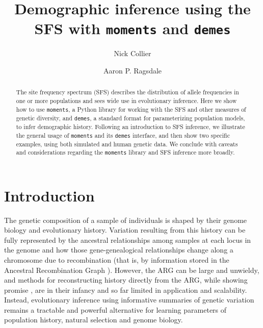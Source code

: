 \documentclass[]{article}
\newcommand{\moments}{\texttt{moments}\xspace}
\newcommand{\demes}{\texttt{demes}\xspace}
\begin{document}
\title{Demographic inference using the SFS with \moments and \demes}
\author[1]{Nick Collier}
\author[1,*]{Aaron P. Ragsdale}
\maketitle


\begin{abstract}

    The site frequency spectrum (SFS) describes the distribution of allele
    frequencies in one or more populations and sees wide use in evolutionary
    inference. Here we show how to use \moments, a Python library for working
    with the SFS and other measures of genetic diversity, and \demes, a
    standard format for parameterizing population models, to infer demographic
    history. Following an introduction to SFS inference, we illustrate the
    general usage of \moments and its \demes interface, and then show two
    specific examples, using both simulated and human genetic data. We conclude
    with caveats and considerations regarding the \moments library and SFS
    inference more broadly.

\end{abstract}

\section*{Introduction}

The genetic composition of a sample of individuals is shaped by their genome
biology and evolutionary history. Variation resulting from this history can be
fully represented by the ancestral relationships among samples at each locus in
the genome and how those gene-genealogical relationships change along a
chromosome due to recombination (that is, by information stored in the
Ancestral Recombination Graph \citep{nielsen2025inference}). However, the ARG
can be large and unwieldy, and methods for reconstructing history directly from
the ARG, while showing promise \citep[e.g.,][]{yc2022evaluation,
fan2023likelihood, brandt2024promise}, are in their infancy and so far limited
in application and scalability. Instead, evolutionary inference using
informative summaries of genetic variation remains a tractable and powerful
alternative for learning parameters of population history, natural selection
and genome biology.
\end{document}
